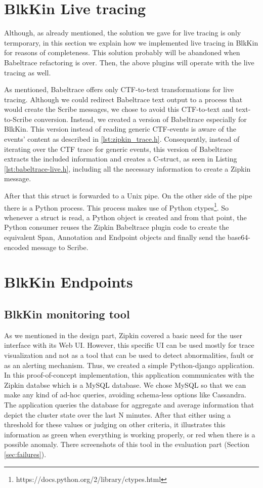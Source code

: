 \section{BlkKin Live tracing}\label{sec:bbl-live}
Although, as already mentioned, the solution we gave for live tracing is only
termporary, in this section we explain how we implemented live tracing in BlkKin
for reasons of completeness. This solution probably will be abandoned when
Babeltrace refactoring is over. Then, the above plugins will operate with the
live tracing as well.

As mentioned, Babeltrace offers only CTF-to-text transformations for live
tracing. Although we could redirect Babeltrace text output to a process that
would create the Scribe messages, we chose to avoid this CTF-to-text and
text-to-Scribe conversion. Instead, we created a version of Babeltrace
especially for BlkKin. This version instead of reading generic CTF-events is
aware of the events' content as described in \ref{lst:zipkin_trace.h}.
Consequently, instead of iterating over the CTF trace for generic events, this
version of Babeltrace extracts the included information and creates a C-struct,
as seen in Listing \ref{lst:babeltrace-live.h}, including all the necessary
information to create a Zipkin message.


After that this struct is forwarded to a Unix pipe. On the other side of the
pipe there is a Python process. This process makes use of Python
ctypes\footnote{https://docs.python.org/2/library/ctypes.html}. So whenever a
struct is read, a Python object is created and from that point, the Python
consumer reuses the Zipkin Babeltrace plugin code to create the equivalent Span,
Annotation and Endpoint objects and finally send the base64-encoded message to
Scribe.

\section{BlkKin Endpoints}\label{sec:blkin-hadoop}

\subsection{BlkKin monitoring tool}
As we mentioned in the design part, Zipkin covered a basic need for the user
interface with its Web UI. However, this specific UI can be used mostly for
trace visualization and not as a tool that can be used to detect abnormalities,
fault or as an alerting mechanism.  Thus, we created a simple Python-django
application. In this proof-of-concept implementation, this application
communicates with the Zipkin databse which is a MySQL database. We chose MySQL
so that we can make any kind of ad-hoc queries, avoiding schema-less options
like Cassandra. The application queries the database for aggregate and average
information that depict the cluster state over the last N minutes. After that
either using a threshold for these values or judging on other criteria, it
illustrates this information as green when everything is working properly, or
red when there is a possible anomaly. There screenshots of this tool in the
evaluation part (Section \ref{sec:failures}).

